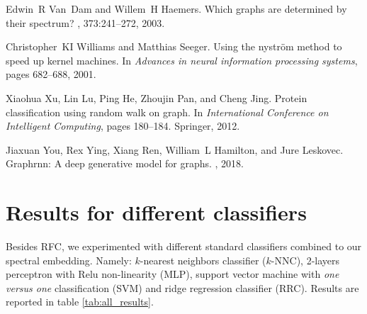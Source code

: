 \documentclass{article}
\begin{document}
\begin{thebibliography}{10}
Edwin~R Van~Dam and Willem~H Haemers.
\newblock Which graphs are determined by their spectrum?
, 373:241--272, 2003.

Christopher~KI Williams and Matthias Seeger.
\newblock Using the nystr{\"o}m method to speed up kernel machines.
\newblock In {\em Advances in neural information processing systems}, pages
  682--688, 2001.

Xiaohua Xu, Lin Lu, Ping He, Zhoujin Pan, and Cheng Jing.
\newblock Protein classification using random walk on graph.
\newblock In {\em International Conference on Intelligent Computing}, pages
  180--184. Springer, 2012.

Jiaxuan You, Rex Ying, Xiang Ren, William~L Hamilton, and Jure Leskovec.
\newblock Graphrnn: A deep generative model for graphs.
, 2018.

\end{thebibliography}

\clearpage
\appendix

\section{Results for different classifiers}
\label{app:all_results}

Besides RFC, we experimented with different standard classifiers combined to our spectral embedding. Namely: $k$-nearest neighbors classifier ($k$-NNC), 2-layers perceptron with Relu non-linearity (MLP), support vector machine with \textit{one versus one} classification (SVM) and ridge regression classifier (RRC). Results are reported in table \ref{tab:all_results}.
\end{document}
